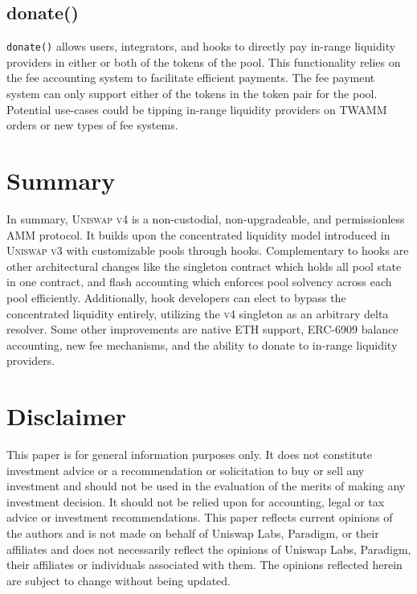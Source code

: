 \documentclass[sigconf,nonacm,prologue,table]{acmart}
\numberwithin{equation}{section}
\theoremstyle{definition}
\theoremstyle{remark}
\begin{document}
\subsection{donate()}
\verb|donate()| allows users, integrators, and hooks to directly pay in-range liquidity providers in either or both of the tokens of the pool. This functionality relies on the fee accounting system to facilitate efficient payments. The fee payment system can only support either of the tokens in the token pair for the pool. Potential use-cases could be tipping in-range liquidity providers on TWAMM orders or new types of fee systems.

\section{Summary}
In summary, \textsc{Uniswap v4} is a non-custodial, non-upgradeable, and permissionless AMM protocol. It builds upon the concentrated liquidity model introduced in \textsc{Uniswap v3} with customizable pools through hooks. Complementary to hooks are other architectural changes like the singleton contract which holds all pool state in one contract, and flash accounting which enforces pool solvency across each pool efficiently. Additionally, hook developers can elect to bypass the concentrated liquidity entirely, utilizing the \textsc{v4} singleton as an arbitrary delta resolver. Some other improvements are native ETH support, ERC-6909 balance accounting, new fee mechanisms, and the ability to donate to in-range liquidity providers.




\section*{Disclaimer}

This paper is for general information purposes only. It does not constitute investment advice or a recommendation or solicitation to buy or sell any investment and should not be used in the evaluation of the merits of making any investment decision. It should not be relied upon for accounting, legal or tax advice or investment recommendations.  This paper reflects current opinions of the authors and is not made on behalf of Uniswap Labs, Paradigm, or their affiliates and does not necessarily reflect the opinions of Uniswap Labs, Paradigm, their affiliates or individuals associated with them. The opinions reflected herein are subject to change without being updated. 
\end{document}
